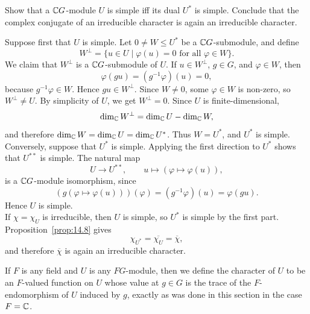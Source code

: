 \documentclass[../Odyssey_Project.tex]{subfiles}
\begin{document}
\begin{exercise}
\label{ex:14.6}
Show that a $\mathbb{C} G$-module $U$ is simple iff its dual $U^*$ is simple. Conclude that the complex conjugate of an irreducible character is again an irreducible character.
\end{exercise}
\begin{solution}
    Suppose first that $U$ is simple. Let $0\neq W\leq U^*$ be a $\mathbb{C} G$-submodule, and define
    \[
        W^{\perp}=\{u\in U\mid \varphi(u)=0\text{ for all }\varphi\in W\}.
    \]
    We claim that $W^{\perp}$ is a $\mathbb{C} G$-submodule of $U$. If $u\in W^{\perp}$, $g\in G$, and $\varphi\in W$, then
    \[
        \varphi(gu)=(g^{-1}\varphi)(u)=0,
    \]
    because $g^{-1}\varphi\in W$. Hence $gu\in W^{\perp}$. Since $W\neq0$, some $\varphi\in W$ is non-zero, so $W^{\perp}\neq U$. By simplicity of $U$, we get $W^{\perp}=0$. Since $U$ is finite-dimensional,
    \[
        \dim_{\mathbb{C}}W^{\perp}=\dim_{\mathbb{C}}U-\dim_{\mathbb{C}}W,
    \]
    and therefore $\dim_{\mathbb{C}}W=\dim_{\mathbb{C}}U=\dim_{\mathbb{C}}U^*$. Thus $W=U^*$, and $U^*$ is simple.\\
    Conversely, suppose that $U^*$ is simple. Applying the first direction to $U^*$ shows that $U^{**}$ is simple. The natural map
    \[
        U\to U^{**},\qquad u\mapsto (\varphi\mapsto \varphi(u)),
    \]
    is a $\mathbb{C} G$-module isomorphism, since
    \[
        (g(\varphi\mapsto \varphi(u)))(\varphi)=(g^{-1}\varphi)(u)=\varphi(gu).
    \]
    Hence $U$ is simple.\\
    If $\chi=\chi_U$ is irreducible, then $U$ is simple, so $U^*$ is simple by the first part. Proposition~\ref{prop:14.8} gives
    \[
        \chi_{U^*}=\overline{\chi_U}=\overline{\chi},
    \]
    and therefore $\overline{\chi}$ is again an irreducible character.
\end{solution}

If $F$ is any field and $U$ is any $FG$-module, then we define the character of $U$ to be an $F$-valued function on $U$ whose value at $g \in G$ is the trace of the $F$-endomorphism of $U$ induced by $g$, exactly as was done in this section in the case $F = \mathbb{C}$.
\end{document}
